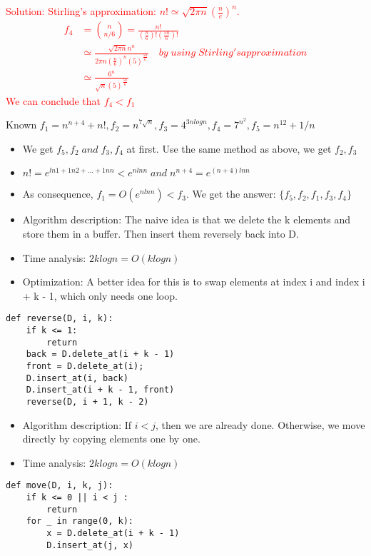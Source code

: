 \documentclass[12pt,twoside]{article}
\begin{document}
\begin{problems}
\begin{problemparts}
\textcolor{red}{Solution: Stirling's approximation: $n!\simeq\sqrt{2\pi n}(\frac{n}{e})^n$. \\
\begin{align}
f_4 &= \binom{n}{n/6}=\frac{n!}{(\frac{n}{6})!(\frac{5n}{6})!} \\
    &\simeq \frac{\sqrt{2\pi n}n^n}{2\pi n(\frac{n}{6})^n(5)^{\frac{5n}{6}}}\quad
    by\;using\;Stirling's approximation \\
    &\simeq \frac{6^n}{\sqrt{n}(5)^{\frac{5n}{6}}} 
\end{align}
We can conclude that $f_4<f_1$
}

\problempart %
Known $f_1=n^{n+4}+n!,f_2=n^{7\sqrt{n}},f_3=4^{3nlogn},f_4=7^{n^2},f_5=n^12+1/n$

\begin{itemize}
    \item We get $f_5,f_2\;and\;f_3,f_4$ at first. Use the same method as above,
          we get $f_2,f_3$
    \item $n!=e^{ln1+1n2+...+1nn}<e^{nlnn}\;and\;n^{n+4}=e^{(n+4)lnn}$
    \item As consequence, $f_1=O(e^{nlnn})<f_3$. We get the answer: $\{f_5,f_2,f_1,f_3,f_4\}$
\end{itemize}

\end{problemparts}

\problem  %

\begin{problemparts}
\problempart %
\begin{itemize}
    \item Algorithm description: The naive idea is that we delete the k elements 
    and store them in a buffer. Then insert them reversely back into D.
    \item Time analysis: $2klogn=O(klogn)$
    \item Optimization: A better idea for this is to swap elements at index 
    i and index i + k - 1, which only needs one loop.
\end{itemize}
\begin{lstlisting}
def reverse(D, i, k):
    if k <= 1:
        return
    back = D.delete_at(i + k - 1)
    front = D.delete_at(i);    
    D.insert_at(i, back)
    D.insert_at(i + k - 1, front)
    reverse(D, i + 1, k - 2)
\end{lstlisting}

\problempart %
\begin{itemize}
    \item Algorithm description: If $i < j$, then we are already done. Otherwise, we move
    directly by copying elements one by one.
    \item Time analysis: $2klogn=O(klogn)$ 
\end{itemize}
\begin{lstlisting}
def move(D, i, k, j):
    if k <= 0 || i < j :
        return
    for _ in range(0, k):
        x = D.delete_at(i + k - 1)
        D.insert_at(j, x)
\end{lstlisting}
\end{problemparts}


\end{problems}
\end{document}
